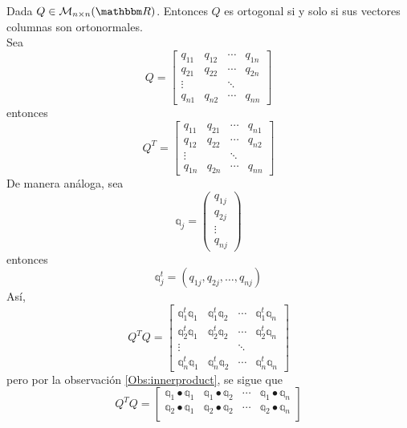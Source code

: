 \begin{theorem}\label{Qorto_vectoresorto}
    Dada $Q \in \mathcal{M}_{n \times n}(\RR)$. Entonces $Q$ es ortogonal si y solo si sus vectores columnas son ortonormales. \\
    \demostracion Sea
    $$Q = \begin{bmatrix}
        q_{11} & q_{12} & \cdots & q_{1n} \\
        q_{21} & q_{22} & \cdots & q_{2n} \\
        \vdots & & \ddots & \\
        q_{n1} & q_{n2} & \cdots & q_{nn}
    \end{bmatrix}$$
    entonces
    $$Q^T = \begin{bmatrix}
        q_{11} & q_{21} & \cdots & q_{n1} \\
        q_{12} & q_{22} & \cdots & q_{n2} \\
        \vdots & & \ddots & \\
        q_{1n} & q_{2n} & \cdots & q_{nn}
    \end{bmatrix}$$
    De manera análoga, sea
    $$\mathbb{q}_j = \begin{pmatrix}
        q_{1j} \\
        q_{2j} \\
        \vdots \\
        q_{nj}
    \end{pmatrix}$$
    entonces
    $$\mathbb{q}_j^t = (q_{1j}, q_{2j}, \dots, q_{nj})$$
    Así,
    $$Q^TQ = \begin{bmatrix}
        \mathbb{q}_1^t \mathbb{q}_1 & \mathbb{q}_1^t \mathbb{q}_2 & \cdots & \mathbb{q}_1^t \mathbb{q}_n \\
        \mathbb{q}_2^t \mathbb{q}_1 & \mathbb{q}_2^t \mathbb{q}_2 & \cdots & \mathbb{q}_2^t \mathbb{q}_n \\
        \vdots & & \ddots & \\
        \mathbb{q}_n^t \mathbb{q}_1 & \mathbb{q}_n^t \mathbb{q}_2 & \cdots & \mathbb{q}_n^t \mathbb{q}_n
    \end{bmatrix}$$\newpage\noindent
    pero por la observación \ref{Obs:innerproduct}, se sigue que
    \begin{equation}
        Q^TQ = \begin{bmatrix}
            \mathbb{q}_1 \bullet \mathbb{q}_1 & \mathbb{q}_1 \bullet \mathbb{q}_2 & \cdots & \mathbb{q}_1 \bullet \mathbb{q}_n \\
            \mathbb{q}_2 \bullet \mathbb{q}_1 & \mathbb{q}_2 \bullet \mathbb{q}_2 & \cdots & \mathbb{q}_2 \bullet \mathbb{q}_n \\

\end{bmatrix}
\end{equation}
\end{theorem}
